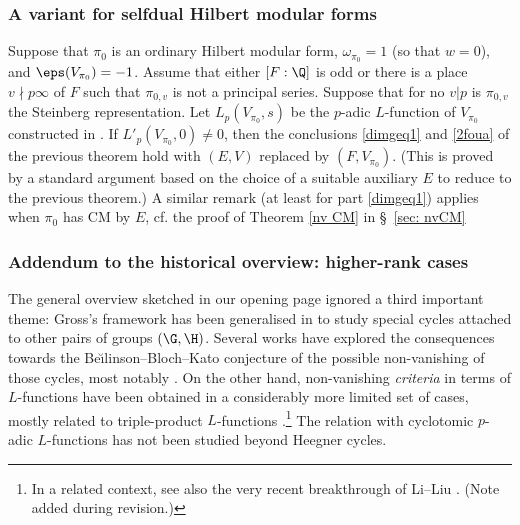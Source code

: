 \subsubsection{A variant for selfdual Hilbert modular forms} Suppose that $\pi_{0}$ is an ordinary  Hilbert modular form,  $\omega_{\pi_{0}}=1$ (so that $w=0$), and $\eps(V_{\pi_{0}})=-1$. Assume that either $[F:\Q]$ is odd or there is a place $v\nmid p\infty$ of $F$ such that $\pi_{0,v}$ is not a principal series. Suppose that for no $v\vert p$ is $\pi_{0,v}$ the Steinberg representation. Let $L_{p}(V_{\pi_{0}}, s)$ be the $p$-adic $L$-function of $V_{\pi_{0}}$ constructed in \cite{dimitrov}.
 If   $L'_{p}(V_{\pi_{0}},0)\neq 0$, then  the conclusions \eqref{dimgeq1} and  \eqref{2foua} of the previous theorem hold with $(E, V)$ replaced by $(F, V_{\pi_{0}})$. (This is proved by a standard argument based on the choice of a suitable auxiliary $E$ to reduce to the previous theorem.) A similar remark (at least for part  \eqref{dimgeq1}) applies when $\pi_{0}$ has CM by $E$, cf. the proof of Theorem \ref{nv CM} in \S~\ref{sec: nvCM}



\subsubsection{Addendum to the historical overview: higher-rank cases}
The general  overview sketched in our opening page ignored a third important theme:
 Gross's framework has been generalised in \cite{ggp} to study  special cycles attached to other pairs of groups $(\G, \H)$. Several works have explored the  consequences towards the Be\u\i linson--Bloch--Kato conjecture of the possible non-vanishing of those cycles, most notably \cite{five}. On the other hand, non-vanishing \emph{criteria} in terms of  $L$-functions have been obtained in a considerably more limited set of cases, mostly related to  triple-product $L$-functions  \cite{YZZ3,xue,dr,bsv,bcf}.\footnote{In a related context,  see also  the very recent breakthrough of Li--Liu \cite{LL}. (Note added during revision.)}  The relation with cyclotomic $p$-adic $L$-functions has not been studied beyond Heegner cycles.














